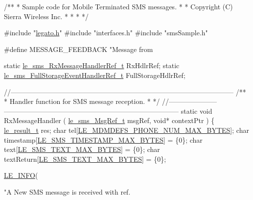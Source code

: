 \begin{DoxyCodeInclude}
\textcolor{comment}{ /**}
\textcolor{comment}{  * Sample code for Mobile Terminated SMS messages.}
\textcolor{comment}{  *}
\textcolor{comment}{  * Copyright (C) Sierra Wireless Inc.}
\textcolor{comment}{  *}
\textcolor{comment}{  *}
\textcolor{comment}{  *}
\textcolor{comment}{  */}

\textcolor{preprocessor}{#include "\hyperlink{legato_8h}{legato.h}"}
\textcolor{preprocessor}{#include "interfaces.h"}
\textcolor{preprocessor}{#include "smsSample.h"}

\textcolor{preprocessor}{#define  MESSAGE\_FEEDBACK "Message from %

\textcolor{keyword}{static} \hyperlink{le__sms__interface_8h_a77d2607cc541bf0369e69bb2d105d4bf}{le\_sms\_RxMessageHandlerRef\_t} RxHdlrRef;
\textcolor{keyword}{static} \hyperlink{le__sms__interface_8h_a30f936dfe4c276ff8025ad2a90a8e4e3}{le\_sms\_FullStorageEventHandlerRef\_t} FullStorageHdlrRef;


\textcolor{comment}{//--------------------------------------------------------------------------------------------------}\textcolor{comment}{}
\textcolor{comment}{/**}
\textcolor{comment}{ * Handler function for SMS message reception.}
\textcolor{comment}{ *}
\textcolor{comment}{ */}
\textcolor{comment}{//--------------------- -----------------------------------------------------------------------------}
\textcolor{keyword}{static} \textcolor{keywordtype}{void} RxMessageHandler
(
    \hyperlink{le__sms__interface_8h_a8eb2a15362fe26516fc68fd7a7d5e3e7}{le\_sms\_MsgRef\_t} msgRef,
    \textcolor{keywordtype}{void}*            contextPtr
)
\{
    \hyperlink{le__basics_8h_a1cca095ed6ebab24b57a636382a6c86c}{le\_result\_t}  res;
    \textcolor{keywordtype}{char}         tel[\hyperlink{le__mdm_defs__interface_8h_ae6d4a4c7892f14d1e340f8df083d479f}{LE\_MDMDEFS\_PHONE\_NUM\_MAX\_BYTES}];
    \textcolor{keywordtype}{char}         timestamp[\hyperlink{le__sms__interface_8h_a9844280f515fbc2b393844e63aa83075}{LE\_SMS\_TIMESTAMP\_MAX\_BYTES}] = \{0\};
    \textcolor{keywordtype}{char}         text[\hyperlink{le__sms__interface_8h_a0dc5c2cec7c1fb166c47393fbb07e43f}{LE\_SMS\_TEXT\_MAX\_BYTES}] = \{0\};
    \textcolor{keywordtype}{char}         textReturn[\hyperlink{le__sms__interface_8h_a0dc5c2cec7c1fb166c47393fbb07e43f}{LE\_SMS\_TEXT\_MAX\_BYTES}] = \{0\};

    \hyperlink{le__log_8h_a23e6d206faa64f612045d688cdde5808}{LE\_INFO}(\textcolor{stringliteral}{"A New SMS message is received with ref.%

}}
\end{DoxyCodeInclude}
